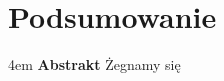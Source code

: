 \chapter{Podsumowanie}
\label{chap:podsumowanie}

\begingroup
\leftskip4em
\rightskip\leftskip
\noindent
\textbf{Abstrakt} Żegnamy się 
\par
\endgroup


